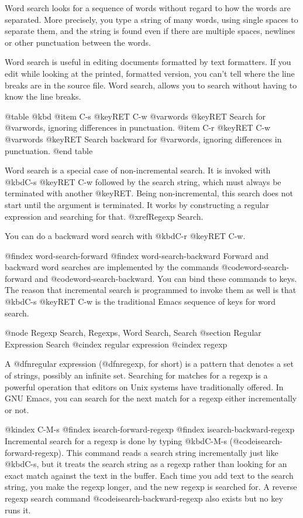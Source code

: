 {{{{  Word search looks for a sequence of words without regard to how the
words are separated.  More precisely, you type a string of many words,
using single spaces to separate them, and the string is found even if
there are multiple spaces, newlines or other punctuation between the words.

  Word search is useful in editing documents formatted by text formatters.
If you edit while looking at the printed, formatted version, you can't tell
where the line breaks are in the source file.  Word search, allows you
to search  without having to know the line breaks.

@table @kbd
@item C-s @key{RET} C-w @var{words} @key{RET}
Search for @var{words}, ignoring differences in punctuation.
@item C-r @key{RET} C-w @var{words} @key{RET}
Search backward for @var{words}, ignoring differences in punctuation.
@end table

  Word search is a special case of non-incremental search.  It is invoked
with @kbd{C-s @key{RET} C-w} followed by the search string, which
must always be terminated with another @key{RET}.  Being non-incremental, this
search does not start until the argument is terminated.  It works by
constructing a regular expression and searching for that.  @xref{Regexp
Search}.

 You can do a backward word search with @kbd{C-r @key{RET} C-w}.

@findex word-search-forward
@findex word-search-backward
  Forward and backward word searches are implemented by the commands
@code{word-search-forward} and @code{word-search-backward}.  You can
bind these commands to keys.  The reason that incremental
search is programmed to invoke them as well is that @kbd{C-s @key{RET} C-w}
is the traditional Emacs sequence of keys for word search.

@node Regexp Search, Regexps, Word Search, Search
@section Regular Expression Search
@cindex regular expression
@cindex regexp

  A @dfn{regular expression} (@dfn{regexp}, for short) is a pattern that
denotes a set of strings, possibly an infinite set.  Searching for matches
for a regexp is a powerful operation that editors on Unix systems have
traditionally offered.  In GNU Emacs, you can search for the next match for
a regexp either incrementally or not.

@kindex C-M-s
@findex isearch-forward-regexp
@findex isearch-backward-regexp
  Incremental search for a regexp is done by typing @kbd{C-M-s}
(@code{isearch-forward-regexp}).  This command reads a search string
incrementally just like @kbd{C-s}, but it treats the search string as a
regexp rather than looking for an exact match against the text in the
buffer.  Each time you add text to the search string, you make the regexp
longer, and the new regexp is searched for.  A reverse regexp search command
@code{isearch-backward-regexp} also exists but no key runs it.

}}}}
